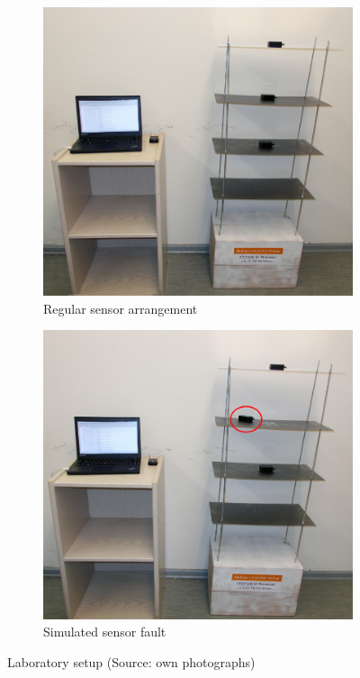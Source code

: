 \documentclass[12pt,a4paper]{scrartcl}
\begin{document}
\begin{figure}[htb]

	\centering
	
	\begin{subfigure}{0.49\textwidth}
		\includegraphics[width=\textwidth]{figures/testsetupcorrect.jpg}
    	\caption{Regular sensor arrangement}
		\label{fig:teststructure}
    \end{subfigure}
  	\begin{subfigure}{0.49\textwidth}
		\includegraphics[width=\textwidth]{figures/testsetuperror.jpg}
    	\caption{Simulated sensor fault}
        \label{fig:sensorfault}
	\end{subfigure}
  	\caption{Laboratory setup (Source: own photographs)}
\end{figure}
\end{document}
